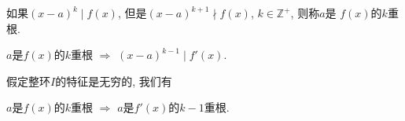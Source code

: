 \begin{Definition}
如果$(x-a)^k \mid f(x)$, 但是$(x-a)^{k+1} \nmid f(x)$, $k \in \mathbb{Z}^+$, 则称$a$是
$f(x)$的$k$重根.
\end{Definition}

\begin{Theorem}
$a$是$f(x)$的$k$重根 $\Rightarrow$ $(x-a)^{k-1} \mid f'(x)$.
\end{Theorem}

\begin{Theorem}
假定整环$I$的特征是无穷的, 我们有
\begin{tightcenter}
$a$是$f(x)$的$k$重根 $\Rightarrow$ $a$是$f'(x)$的$k-1$重根.
\end{tightcenter}
\end{Theorem}